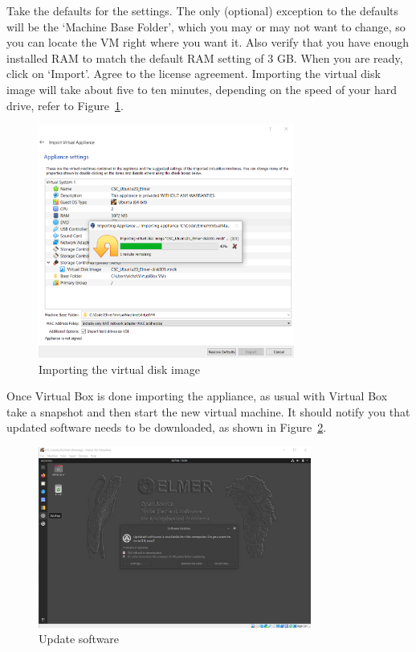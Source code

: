 Take the defaults for the settings.  The only (optional) exception to the defaults will be the `Machine Base Folder', which you may or may not want to change, so you can locate the VM right where you want it.  Also verify that you have enough installed RAM to match the default RAM setting of 3 GB.  When you are ready, click on `Import'.  Agree to the license agreement.  Importing the virtual disk image will take about five to ten minutes, depending on the speed of your hard drive, refer to Figure~\ref{fg:virt-5}.

\begin{figure}[H]
\begin{center}
\includegraphics[width=0.75\textwidth]{virt-5}
\caption{Importing the virtual disk image}\label{fg:virt-5}
\end{center}
\end{figure}

Once Virtual Box is done importing the appliance, as usual with Virtual Box take a snapshot and then start the new virtual machine.  It should notify you that updated software needs to be downloaded, as shown in Figure~\ref{fg:virt-6}.

\begin{figure}[H]
\begin{center}
\includegraphics[width=0.8\textwidth]{virt-6}
\caption{Update software}\label{fg:virt-6}
\end{center}
\end{figure}

